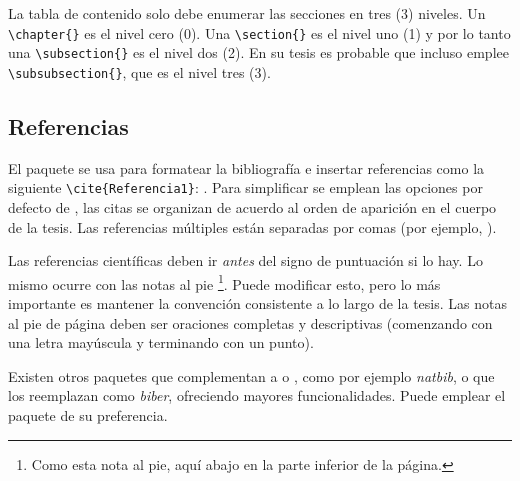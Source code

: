 La tabla de contenido solo debe enumerar las secciones en tres (3) niveles. Un \verb|\chapter{}| es el nivel cero (0). Una \verb|\section{}| es el nivel uno (1) y por lo tanto una \verb|\subsection{}| es el nivel dos (2). En su tesis es probable que incluso emplee \verb|\subsubsection{}|, que es el nivel tres (3).

\subsection{Referencias}


El paquete  se usa para formatear la bibliografía e insertar referencias como la siguiente \verb*|\cite{Referencia1}|: \cite{Referencia1}. Para simplificar se emplean las opciones por defecto de , las citas se organizan de acuerdo al orden de aparición en el cuerpo de la tesis. Las referencias múltiples están separadas por comas (por ejemplo, \cite{Referencia2, Referencia1}).

Las referencias científicas deben ir \emph{antes} del signo de puntuación si lo hay. Lo mismo ocurre con las notas al pie \footnote{Como esta nota al pie, aquí abajo en la parte inferior de la página.}. Puede modificar esto, pero lo más importante es mantener la convención consistente a lo largo de la tesis. Las notas al pie de página deben ser oraciones completas y descriptivas (comenzando con una letra mayúscula y terminando con un punto).

Existen otros paquetes que complementan a  o , como por ejemplo \emph{natbib}, o que los reemplazan como \emph{biber}, ofreciendo mayores funcionalidades. Puede emplear el paquete de su preferencia.












